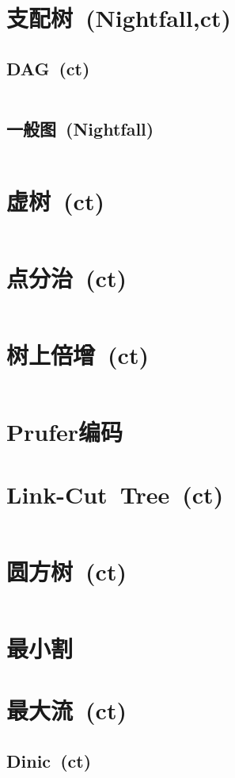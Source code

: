 \section{支配树\ \small(Nightfall,ct)}
	\subsection*{DAG\ \small(ct)}
		\inputminted{cpp}{GraphTheory/dominator_tree_dag.cpp}
	\subsection*{一般图\ \small(Nightfall)}
		\inputminted{cpp}{GraphTheory/dominator_tree.cpp}
\section{虚树\ \small(ct)}
	\inputminted{cpp}{GraphTheory/virtual_tree.cpp}
\section{点分治\ \small(ct)}
	\inputminted{cpp}{GraphTheory/divide_conquer_on_tree.cpp}
\section{树上倍增\ \small(ct)}
	\inputminted{cpp}{GraphTheory/multiplier_on_tree.cpp}
\section{Prufer编码}
\section{Link-Cut\ Tree\ \small(ct)}
	\inputminted{cpp}{GraphTheory/link_cut_tree.cpp}
\section{圆方树\ \small(ct)}
	\inputminted{cpp}{GraphTheory/circle_square_tree.cpp}
\section{最小割}
\section{最大流\ \small(ct)}
	\subsection*{Dinic\ \small(ct)}
		\inputminted{cpp}{GraphTheory/dinic.cpp}
